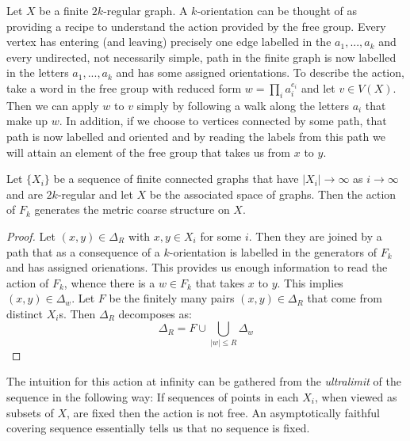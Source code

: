 \begin{remark}
Let $X$ be a finite $2k$-regular graph. A $k$-orientation can be thought of as providing a recipe to understand the action provided by the free group. Every vertex has entering (and leaving) precisely one edge labelled in the $a_{1},...,a_{k}$ and every undirected, not necessarily simple, path in the finite graph is now labelled in the letters $a_{1},...,a_{k}$ and has some assigned orientations. To describe the action, take a word in the free group with reduced form $w=\prod_{i}a_{i}^{e_{i}}$ and let $v \in V(X)$. Then we can apply $w$ to $v$ simply by following a walk along the letters $a_{i}$ that make up $w$. In addition, if we choose to vertices connected by some path, that path is now labelled and oriented and by reading the labels from this path we will attain an element of the free group that takes us from $x$ to $y$.
\end{remark}

\begin{lemma}\label{Lem:MT2}
Let $\lbrace X_{i} \rbrace$ be a sequence of finite connected graphs that have $\vert X_{i} \vert \rightarrow \infty$ as $i \rightarrow \infty$ and are $2k$-regular and let $X$ be the associated space of graphs. Then the action of $F_{k}$ generates the metric coarse structure on $X$.
\end{lemma}
\begin{proof}
Let $(x,y) \in \Delta_{R}$ with $x,y \in X_{i}$ for some $i$. Then they are joined by a path that as a consequence of a $k$-orientation is labelled in the generators of $F_{k}$ and has assigned orienations. This provides us enough information to read the action of $F_{k}$, whence there is a $w \in F_{k}$ that takes $x$ to $y$. This implies $(x,y) \in \Delta_{w}$. Let $F$ be the finitely many pairs $(x,y) \in \Delta_{R}$ that come from distinct $X_{i}$s. Then $\Delta_{R}$ decomposes as:
\begin{equation*}
\Delta_{R} = F \cup \bigcup_{\vert w \vert \leq R} \Delta_{w}
\end{equation*}

\end{proof}

The intuition for this action at infinity can be gathered from the \textit{ultralimit} of the sequence in the following way: If sequences of points in each $X_{i}$, when viewed as subsets of $X$, are fixed then the action is not free. An asymptotically faithful covering sequence essentially tells us that no sequence is fixed.

